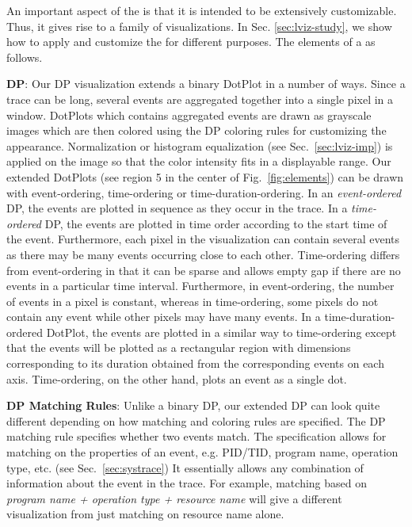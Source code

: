 An important aspect of the \VDP{} is that it is intended to 
be extensively customizable. Thus, it gives rise to a family of visualizations.
In Sec. \ref{sec:lviz-study}, we show how to apply and customize
the \VDP{} for different purposes. The elements of a \VDP{} as follows.

{\bf DP}:
Our DP visualization extends a binary DotPlot in a number of ways.
Since a trace can be long, several events are aggregated 
together into a single pixel in a window.
DotPlots which contains aggregated events are drawn as grayscale images
which are then colored using the DP coloring rules for customizing
the appearance.
Normalization or histogram equalization (see Sec.~\ref{sec:lviz-imp})
is applied on the image so that the color intensity fits in a displayable range.
Our extended DotPlots (see region 5 in the center of Fig.~\ref{fig:elements})
can be drawn with event-ordering, time-ordering or time-duration-ordering.
In an {\em event-ordered} DP, the events are plotted in
sequence as they occur in the trace.
In a {\em time-ordered} DP, the events are plotted in time order
according to the start time of the event.
Furthermore, each pixel in the visualization can contain several events
as there may be many events occurring close to each other.
Time-ordering differs from event-ordering in that it can be sparse
and allows empty gap if there are no events in a particular time interval.
Furthermore, in event-ordering,
the number of events in a pixel is constant, whereas
in time-ordering,
some pixels do not contain any event while other pixels may have many events.
In a time-duration-ordered DotPlot, the events are plotted in a similar way
to time-ordering
except that the events will be plotted as a rectangular region
with dimensions corresponding to its duration obtained from
the corresponding events on each axis.
Time-ordering, on the other hand, plots 
an event as a single dot.

{\bf DP Matching Rules}:
Unlike a binary DP, our extended DP can look quite different depending
on how matching and coloring rules are specified.
The DP matching rule specifies whether two events
match. The specification allows for matching on 
the properties of an event, e.g. PID/TID, program name,
operation type, etc. (see Sec.~\ref{sec:systrace})
It essentially allows any combination of information about
the event in the trace.
For example, matching based on {\it program name + operation type + resource name}
will give a different visualization from just matching on resource name alone.

